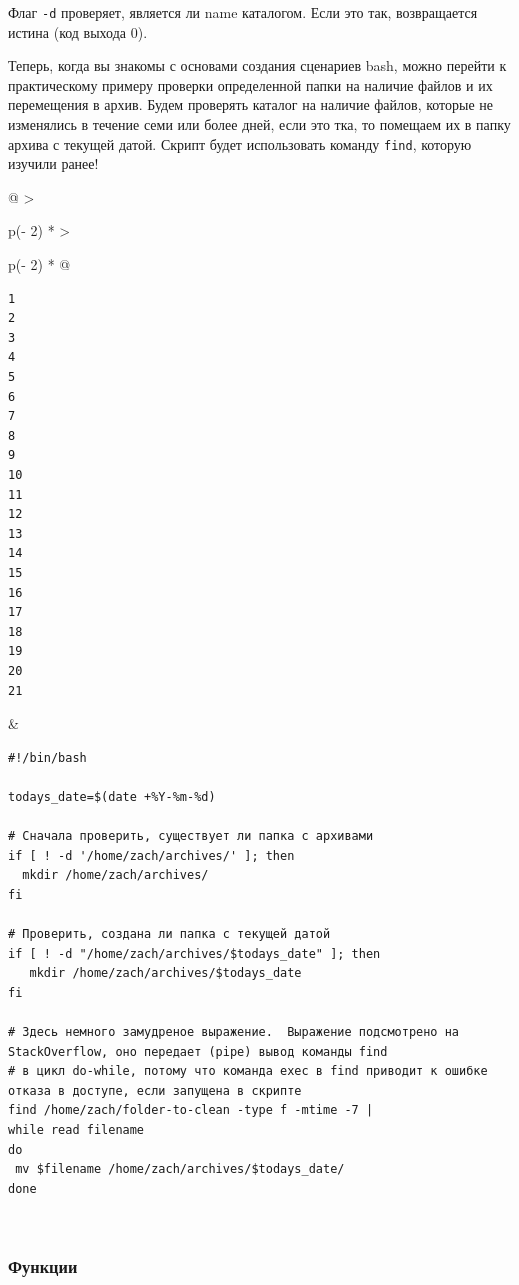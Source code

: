 \documentclass{report}
\begin{document}
Флаг \texttt{-d} проверяет, является ли name каталогом. Если это так,
возвращается истина (код выхода 0).

Теперь, когда вы знакомы с основами создания сценариев bash, можно
перейти к практическому примеру проверки определенной папки на наличие
файлов и их перемещения в архив. Будем проверять каталог на наличие
файлов, которые не изменялись в течение семи или более дней, если это
тка, то помещаем их в папку архива с текущей датой. Скрипт будет
использовать команду \texttt{find}, которую изучили ранее!

\begin{longtable}[]{@{}
  >{\raggedright\arraybackslash}p{(\columnwidth - 2\tabcolsep) * }
  >{\raggedright\arraybackslash}p{(\columnwidth - 2\tabcolsep) * }@{}}
\toprule
\endhead
\begin{minipage}[t]{\linewidth}\raggedright
\begin{verbatim}
1
2
3
4
5
6
7
8
9
10
11
12
13
14
15
16
17
18
19
20
21
\end{verbatim}
\end{minipage} & \begin{minipage}[t]{\linewidth}\raggedright
\begin{verbatim}
#!/bin/bash

todays_date=$(date +%Y-%m-%d)

# Сначала проверить, существует ли папка с архивами
if [ ! -d '/home/zach/archives/' ]; then
  mkdir /home/zach/archives/
fi

# Проверить, создана ли папка с текущей датой
if [ ! -d "/home/zach/archives/$todays_date" ]; then
   mkdir /home/zach/archives/$todays_date
fi

# Здесь немного замудреное выражение.  Выражение подсмотрено на StackOverflow, оно передает (pipe) вывод команды find
# в цикл do-while, потому что команда exec в find приводит к ошибке отказа в доступе, если запущена в скрипте
find /home/zach/folder-to-clean -type f -mtime -7 |
while read filename
do
 mv $filename /home/zach/archives/$todays_date/
done
\end{verbatim}
\end{minipage} \\ \addlinespace
\bottomrule
\end{longtable}

\hypertarget{Functions}{%
\subsubsection{\texorpdfstring{\protect\hyperlink{Functions}{}Функции}{Функции}}\label{Functions}}
\end{document}
